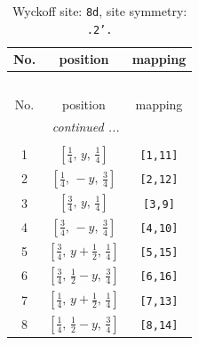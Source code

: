 \documentclass[fleqn,8pt]{jsarticle}
\begin{document}
\begin{longtable}{ccc}
\caption{Wyckoff site: {\tt 8d}, site symmetry: {\tt .2'.}}
 \\
 \hline \hline
No. & position & mapping \\ \hline \endfirsthead

\multicolumn{2}{l}{\tablename\ \thetable{}} \\
 \hline \hline
No. & position & mapping \\ \hline \endhead

 \hline \hline
\multicolumn{2}{r}{\footnotesize\it continued ...} \\ \endfoot

 \hline \hline
\multicolumn{2}{r}{} \\ \endlastfoot

1 & $\left[ \frac{1}{4},\, y,\, \frac{1}{4} \right]$ & {\tt [1,11]} \\ \hline
2 & $\left[ \frac{1}{4},\, - y,\, \frac{3}{4} \right]$ & {\tt [2,12]} \\ \hline
3 & $\left[ \frac{3}{4},\, y,\, \frac{1}{4} \right]$ & {\tt [3,9]} \\ \hline
4 & $\left[ \frac{3}{4},\, - y,\, \frac{3}{4} \right]$ & {\tt [4,10]} \\ \hline
5 & $\left[ \frac{3}{4},\, y + \frac{1}{2},\, \frac{1}{4} \right]$ & {\tt [5,15]} \\ \hline
6 & $\left[ \frac{3}{4},\, \frac{1}{2} - y,\, \frac{3}{4} \right]$ & {\tt [6,16]} \\ \hline
7 & $\left[ \frac{1}{4},\, y + \frac{1}{2},\, \frac{1}{4} \right]$ & {\tt [7,13]} \\ \hline
8 & $\left[ \frac{1}{4},\, \frac{1}{2} - y,\, \frac{3}{4} \right]$ & {\tt [8,14]} \\
\end{longtable}
\renewcommand{\arraystretch}{1.2}
\end{document}
